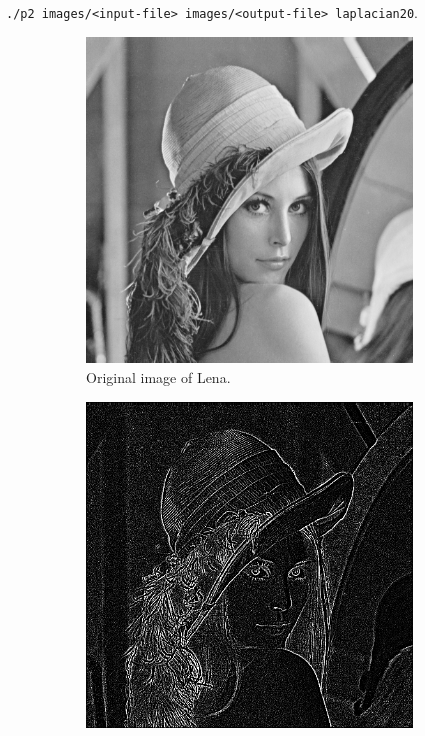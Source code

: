 \documentclass{article}
\theoremstyle{problemstyle}
\begin{document}
\begin{problem}
\begin{enumerate}[a)]
\texttt{./p2 images/<input-file> images/<output-file> laplacian20}.

	      \begin{figure}[H]
		      \begin{subfigure}{.45\textwidth}
			      \centering
			      \includegraphics[width=0.95\textwidth]{lena_ascii.png}
			      \caption{Original image of Lena.}
		      \end{subfigure}
		      \hfill
		      \begin{subfigure}{.45\textwidth}
			      \centering
			      \includegraphics[width=0.95\textwidth]{lena_laplacian20.png}

\end{subfigure}
\end{figure}
\end{enumerate}
\end{problem}
\end{document}
